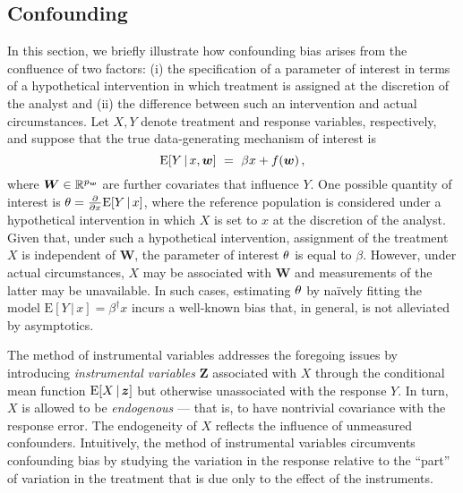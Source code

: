 \documentclass{uwstat572}
\newcommand{\be}{\begin{equation}}
\newcommand{\ee}{\end{equation}}
\theoremstyle{definition}
\theoremstyle{remark}
\newcommand{\R}{\ensuremath{\mathbb{R}}}
\newcommand{\gb}{\beta}
\newcommand{\gep}{\epsilon}
\newcommand{\pdd}[2]{\frac{\partial #1}{\partial #2}}
\newcommand{\E}{\mathrm{E}}
\newcommand{\bs}[1]{\boldsymbol{#1}}
\numberwithin{equation}{section}
\begin{document}
%

\subsection{Confounding}\label{sec:conf}
\newcommand{\efc}{\bs{\gamma}}
\newcommand{\W}{\bs{W}}
\newcommand{\Z}{\bs{Z}}
\newcommand{\erry}{\gep}
\newcommand{\pd}{\partial}

In this section, we briefly illustrate how confounding bias arises from the confluence of two factors: (i) the specification of a parameter of interest in terms of a hypothetical intervention in which treatment is assigned at the discretion of the analyst and (ii) the difference between such an intervention and actual circumstances. Let $X, Y$ denote treatment and response variables, respectively, and suppose that the true data-generating mechanism of interest is
\be\label{eq:conf1}
	\E[Y\,|\,x, \w] \ = \ \gb x + f(\w) \,, %
\ee
where $\W\in\R^\pw$ are further covariates that influence $Y$. One possible quantity of interest is $\eft = \pdd{}{x}\E[Y\,|\,x]$, where the reference population is considered under a hypothetical intervention in which $X$ is set to $x$ at the discretion of the analyst. Given that, under such a hypothetical intervention, assignment of the treatment $X$ is independent of $\W$, the parameter of interest $\theta$ is equal to $\gb$. However, under actual circumstances, $X$ may be associated with $\W$ and measurements of the latter may be unavailable. In such cases, estimating $\theta$ by na\"ively fitting the model $\E[Y\,|\,x] = \gb^\dagger x$ incurs a well-known bias that, in general, is not alleviated by asymptotics.
 
The method of instrumental variables addresses the foregoing issues by introducing \emph{instrumental variables} $\Z$ associated with $X$ through the conditional mean function $\E[X\,|\,\z]$ but otherwise unassociated with the response $Y$. In turn, $X$ is allowed to be \emph{endogenous} --- that is, to have nontrivial covariance with the response error. The endogeneity of $X$ reflects the influence of unmeasured confounders. Intuitively, the method of instrumental variables circumvents confounding bias by studying the variation in the response relative to the ``part'' of variation in the treatment that is due only to the effect of the instruments. 

\end{document}
